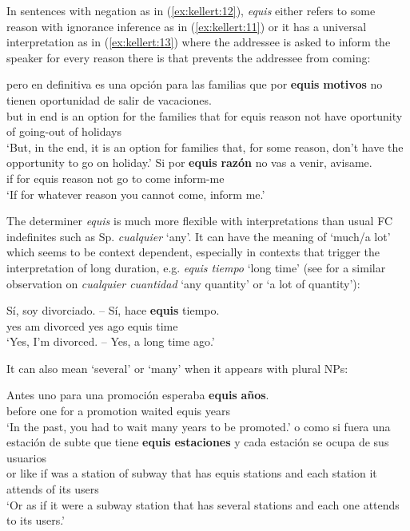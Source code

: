 \documentclass[output=paper]{langsci/langscibook}
\begin{document}
In sentences with negation as in (\ref{ex:kellert:12}), \textit{equis} either refers to some reason with ignorance inference as in (\ref{ex:kellert:11}) or it has a universal interpretation as in (\ref{ex:kellert:13}) where the addressee is asked to inform the speaker for every reason there is that prevents the addressee from coming:

\ea \label{ex:kellert:12}
\gll  pero en definitiva es una opción para las familias que por \textbf{equis} \textbf{motivos} no tienen oportunidad de salir de vacaciones.\\
but in end is an option for the families that for equis reason not have oportunity of going-out of holidays\\
\glt ‘But, in the end, it is an option for families that, for some reason, don’t have the opportunity to go on holiday.’
\ex \label{ex:kellert:13}
\gll  Si por \textbf{equis} \textbf{razón} no vas a venir, avisame.\\
if for equis reason not go to come inform-me\\
\glt ‘If for whatever reason you cannot come, inform me.’
\z

The determiner \textit{equis} is much more flexible with interpretations than usual FC indefinites such as Sp. \textit{cualquier} ‘any’. It can have the meaning of ‘much/a lot’ which seems to be context dependent, especially in contexts that trigger the interpretation of long duration, e.g. \textit{equis tiempo} ‘long time’ (see \citealt{Rivero2011} for a similar observation on \textit{cualquier cuantidad} ‘any quantity’ or ‘a lot of quantity’):

\ea\label{ex:kellert:14}
\gll Sí, soy divorciado. -- Sí, hace \textbf{equis} tiempo.\\
yes am divorced {} yes ago equis time\\
\glt ‘Yes, I’m divorced. -- Yes, a long time ago.’
\z

It can also mean ‘several’ or ‘many’ when it appears with plural NPs:

\ea\label{ex:kellert:15}
\gll  Antes uno para una promoción esperaba \textbf{equis} \textbf{años}.\\
before one for a promotion waited equis years\\
\glt ‘In the past, you had to wait many years to be promoted.’
\ex 
\gll  o como si fuera una estación de subte que tiene \textbf{equis} \textbf{estaciones} y cada estación se ocupa de sus usuarios\\
or like if was a station of subway that has equis stations and each station it attends of its users\\
\glt ‘Or as if it were a subway station that has several stations and each one attends to its users.’
\z
\end{document}
